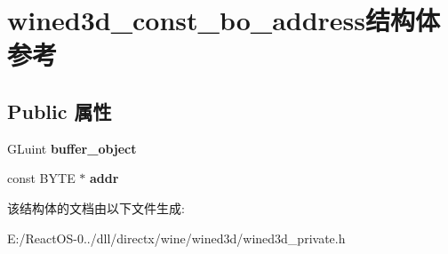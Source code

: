 \hypertarget{structwined3d__const__bo__address}{}\section{wined3d\+\_\+const\+\_\+bo\+\_\+address结构体 参考}
\label{structwined3d__const__bo__address}
\subsection*{Public 属性}
\begin{DoxyCompactItemize}
\item 
\mbox{\label{structwined3d__const__bo__address_aa604bd25b6960244891b437854154c4e}} 
G\+Luint {\bfseries buffer\+\_\+object}
\item 
\mbox{\label{structwined3d__const__bo__address_ab4e28218a6f7822ddc66286e5cb46b03}} 
const B\+Y\+TE $\ast$ {\bfseries addr}
\end{DoxyCompactItemize}


该结构体的文档由以下文件生成\+:\begin{DoxyCompactItemize}
\item 
E\+:/\+React\+O\+S-\/0../dll/directx/wine/wined3d/wined3d\+\_\+private.\+h\end{DoxyCompactItemize}
